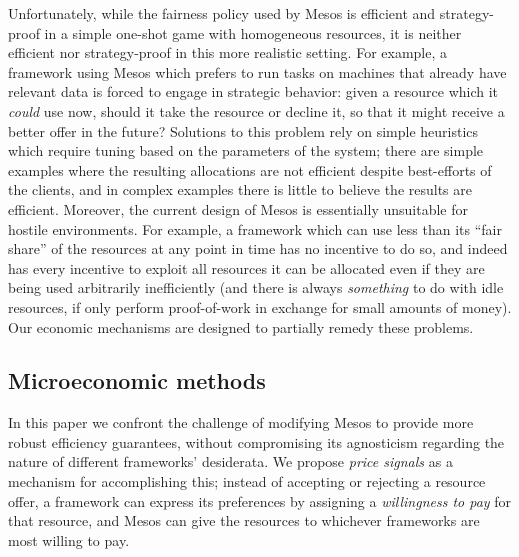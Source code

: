 \documentclass{acm_proc_article-sp}
\begin{document}
Unfortunately, while the fairness policy used by Mesos is efficient and
strategy-proof in a simple one-shot game with homogeneous resources, it is
neither efficient nor strategy-proof in this more realistic setting. 
For example, a framework
using Mesos which prefers to run tasks on machines that already have relevant
data is forced to engage in strategic behavior: given a resource which it
\emph{could} use now, should it take the resource or decline it, so that it
might receive a better offer in the future? Solutions to this problem rely on
simple heuristics which require tuning based on the parameters of the system;
there are simple examples where the resulting allocations are not efficient
despite best-efforts of the clients, and in complex examples there is little to
believe the results are efficient. 
Moreover, the
current design of Mesos is essentially unsuitable for hostile
environments. 
For example,
a framework which can use less than its ``fair share'' of the
resources at any point in time has no incentive to do so, and indeed has every
incentive to exploit all resources it can be allocated even if they are being
used arbitrarily inefficiently (and there is always \emph{something} to do with
idle resources, if only perform proof-of-work in exchange for small amounts of
money).
Our economic mechanisms are designed to partially remedy these problems.

\subsection{Microeconomic methods}
In this paper we confront the challenge of modifying Mesos to provide more
robust efficiency guarantees, without compromising its agnosticism regarding the
nature of different frameworks' desiderata. We propose \emph{price signals} as a
mechanism for accomplishing this; instead of accepting or rejecting a resource
offer, a framework can express its preferences by assigning a \emph{willingness
to pay} for that resource, and Mesos can give the resources to whichever
frameworks are most willing to pay.
\end{document}
